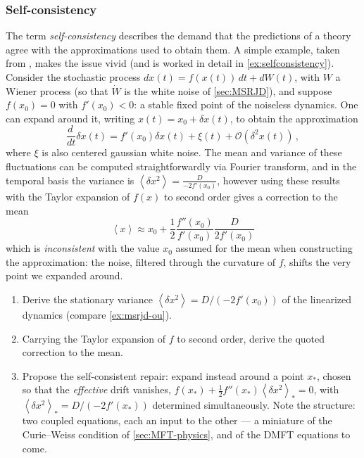 \documentclass[11pt]{article}
\newcommand{\expval}[1]{\left\langle #1 \right\rangle}
\newcommand{\dv}[2]{\frac{d #1}{d #2}}
\begin{document}
\subsubsection{Self-consistency}

The term \emph{self-consistency} describes the demand that the predictions of a theory agree with the approximations used to obtain them. A simple example, taken from \cite{stapmannsSelfconsistentFormulationsStochastic2020}, makes the issue vivid (and is worked in detail in \cref{ex:selfconsistency}). Consider the stochastic process $d x (t) = f (x(t))\, d t + dW(t)$, with $W$ a Wiener process (so that $\dot W$ is the white noise of \cref{sec:MSRJD}), and suppose $f(x_0) = 0$ with $f'(x_0)<0$: a stable fixed point of the noiseless dynamics. One can expand around it, writing $x(t) = x_0 + \delta x(t)$, to obtain the approximation
\begin{equation}
    \dv{\,}{t}\delta x(t) = f'(x_0) \delta x(t) + \xi(t) + \mathcal{O}(\delta ^2 x(t))\,,
\end{equation}
where $\xi$ is also centered gaussian white noise.  The mean and variance of these fluctuations can be computed straightforwardly via Fourier transform, and in the temporal basis the variance is $\expval{\delta x^2} = \frac{D}{- 2 f'(x_0)}$, however using these results with the Taylor expansion of $f(x)$ to second order gives a correction to the mean
\begin{equation}
    \expval{x} \approx x_0 + \frac{1}{2} \frac{f''(x_0)}{f'(x_0)} \frac{D}{2 f'(x_0)} 
\end{equation}
which is \emph{inconsistent} with the value $x_0$ assumed for the mean when constructing the approximation: the noise, filtered through the curvature of $f$, shifts the very point we expanded around.

\begin{exercise}
\label{ex:selfconsistency}
\begin{enumerate}
  \item Derive the stationary variance $\expval{\delta x^2} = D/(-2f'(x_0))$ of the linearized dynamics (compare \cref{ex:msrjd-ou}).
  \item Carrying the Taylor expansion of $f$ to second order, derive the quoted correction to the mean.
  \item Propose the self-consistent repair: expand instead around a point $x_*$, chosen so that the \emph{effective} drift vanishes, $f(x_*) + \tfrac{1}{2} f''(x_*)\expval{\delta x^2}_* = 0$, with $\expval{\delta x^2}_* = D/(-2f'(x_*))$ determined simultaneously. Note the structure: two coupled equations, each an input to the other --- a miniature of the Curie--Weiss condition of \cref{sec:MFT-physics}, and of the DMFT equations to come.
\end{enumerate}
\end{exercise}
\end{document}
